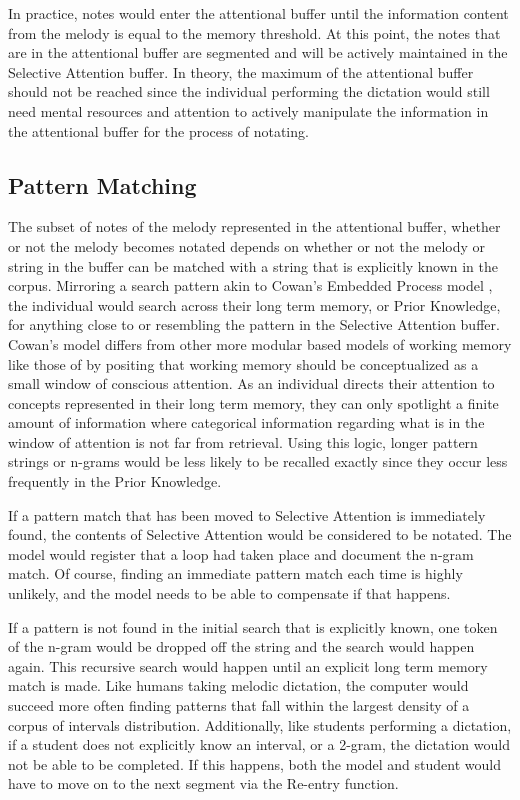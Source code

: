 \documentclass[12pt,]{book}
\begin{document}
In practice, notes would enter the attentional buffer until the information content from the melody is equal to the memory threshold.
At this point, the notes that are in the attentional buffer are segmented and will be actively maintained in the Selective Attention buffer.
In theory, the maximum of the attentional buffer should not be reached since the individual performing the dictation would still need mental resources and attention to actively manipulate the information in the attentional buffer for the process of notating.

\hypertarget{pattern-matching}{%
\subsection{Pattern Matching}\label{pattern-matching}}

The subset of notes of the melody represented in the attentional buffer, whether or not the melody becomes notated depends on whether or not the melody or string in the buffer can be matched with a string that is explicitly known in the corpus.
Mirroring a search pattern akin to Cowan's Embedded Process model \citep{cowanEvolvingConceptionsMemory1988, cowanMagicalMysteryFour2010}, the individual would search across their long term memory, or Prior Knowledge, for anything close to or resembling the pattern in the Selective Attention buffer.
Cowan's model differs from other more modular based models of working memory like those of \citet{baddeleyWorkingMemory1974} by positing that working memory should be conceptualized as a small window of conscious attention.
As an individual directs their attention to concepts represented in their long term memory, they can only spotlight a finite amount of information where categorical information regarding what is in the window of attention is not far from retrieval.
Using this logic, longer pattern strings or n-grams would be less likely to be recalled exactly since they occur less frequently in the Prior Knowledge.

If a pattern match that has been moved to Selective Attention is immediately found, the contents of Selective Attention would be considered to be notated.
The model would register that a loop had taken place and document the n-gram match.
Of course, finding an immediate pattern match each time is highly unlikely, and the model needs to be able to compensate if that happens.

If a pattern is not found in the initial search that is explicitly known, one token of the n-gram would be dropped off the string and the search would happen again.
This recursive search would happen until an explicit long term memory match is made.
Like humans taking melodic dictation, the computer would succeed more often finding patterns that fall within the largest density of a corpus of intervals distribution.
Additionally, like students performing a dictation, if a student does not explicitly know an interval, or a 2-gram, the dictation would not be able to be completed.
If this happens, both the model and student would have to move on to the next segment via the Re-entry function.
\end{document}
